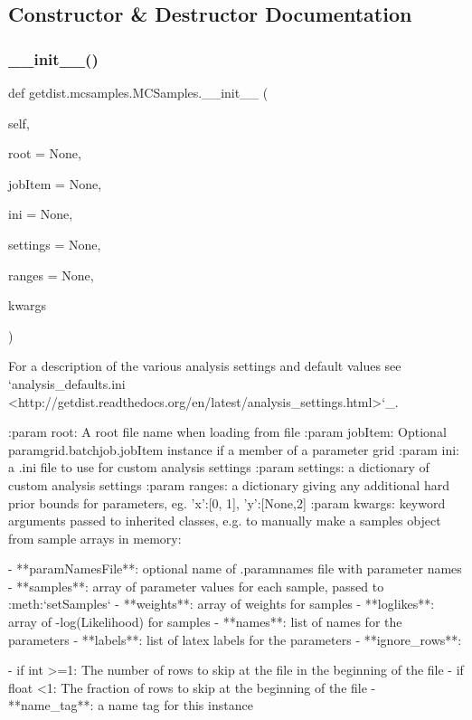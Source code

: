 \subsection{Constructor \& Destructor Documentation}
\mbox{\label{classgetdist_1_1mcsamples_1_1MCSamples_a483006ab43cb5e5e57129dc3977db2a5}} 
\subsubsection{\texorpdfstring{\+\_\+\+\_\+init\+\_\+\+\_\+()}{\_\_init\_\_()}}
{\footnotesize\ttfamily def getdist.\+mcsamples.\+M\+C\+Samples.\+\_\+\+\_\+init\+\_\+\+\_\+ (\begin{DoxyParamCaption}\item[{}]{self,  }\item[{}]{root = {\ttfamily None},  }\item[{}]{job\+Item = {\ttfamily None},  }\item[{}]{ini = {\ttfamily None},  }\item[{}]{settings = {\ttfamily None},  }\item[{}]{ranges = {\ttfamily None},  }\item[{}]{kwargs }\end{DoxyParamCaption})}

\begin{DoxyVerb}For a description of the various analysis settings and default values see
`analysis_defaults.ini <http://getdist.readthedocs.org/en/latest/analysis_settings.html>`_.


:param root: A root file name when loading from file 
:param jobItem: Optional paramgrid.batchjob.jobItem instance if a member of a parameter grid
:param ini: a .ini file to use for custom analysis settings
:param settings: a dictionary of custom analysis settings
:param ranges: a dictionary giving any additional hard prior bounds for parameters, eg. {'x':[0, 1], 'y':[None,2]}
:param kwargs: keyword arguments passed to inherited classes, e.g. to manually make a samples object from sample arrays in memory:

       - **paramNamesFile**: optional name of .paramnames file with parameter names
       - **samples**: array of parameter values for each sample, passed to :meth:`setSamples`
       - **weights**: array of weights for samples
       - **loglikes**: array of -log(Likelihood) for samples
       - **names**: list of names for the parameters
       - **labels**:  list of latex labels for the parameters
       - **ignore_rows**:
       
     - if int >=1: The number of rows to skip at the file in the beginning of the file
     - if float <1: The fraction of rows to skip at the beginning of the file
       - **name_tag**: a name tag for this instance
\end{DoxyVerb}
 

